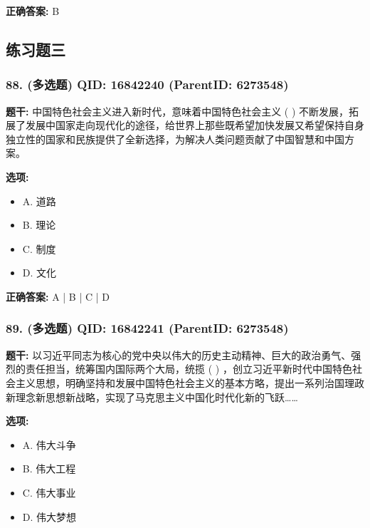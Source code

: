 \documentclass[12pt,UTF8]{ctexart}
\begin{document}
\textbf{正确答案:}
B

\vspace{0.3em}\hrulefill\vspace{0.7em}

\subsection*{练习题三}

\subsubsection*{88. (多选题) \small QID: 16842240 (ParentID: 6273548)}

\textbf{题干:}
中国特色社会主义进入新时代，意味着中国特色社会主义 ( ) 不断发展，拓展了发展中国家走向现代化的途径，给世界上那些既希望加快发展又希望保持自身独立性的国家和民族提供了全新选择，为解决人类问题贡献了中国智慧和中国方案。



\textbf{选项:}
\begin{itemize}[leftmargin=*]

  \item A. 道路

  \item B. 理论

  \item C. 制度

  \item D. 文化

\end{itemize}

\textbf{正确答案:}
A | B | C | D

\vspace{0.3em}\hrulefill\vspace{0.7em}

\subsubsection*{89. (多选题) \small QID: 16842241 (ParentID: 6273548)}

\textbf{题干:}
以习近平同志为核心的党中央以伟大的历史主动精神、巨大的政治勇气、强烈的责任担当，统筹国内国际两个大局，统揽 ( ) ，创立习近平新时代中国特色社会主义思想，明确坚持和发展中国特色社会主义的基本方略，提出一系列治国理政新理念新思想新战略，实现了马克思主义中国化时代化新的飞跃……



\textbf{选项:}
\begin{itemize}[leftmargin=*]

  \item A. 伟大斗争

  \item B. 伟大工程

  \item C. 伟大事业

  \item D. 伟大梦想

\end{itemize}
\end{document}
